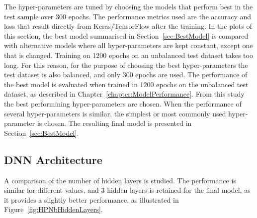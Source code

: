 The hyper-parameters are tuned by choosing the models that perform best in the test sample over 300 epochs. The performance metrics used are the accuracy and loss that result directly from Keras/TensorFlow after the training. In the plots of this section, the best model summarised in Section~\ref{sec:BestModel} is compared with alternative models where all hyper-parameters are kept constant, except one that is changed. Training on 1200 epochs on an unbalanced test dataset takes too long. For this reason, for the purpose of choosing the best hyper-parameters the test dataset is also balanced, and only 300 epochs are used. The performance of the best model is evaluated when trained in 1200 epochs on the unbalanced test dataset, as described in Chapter~\ref{chapter:ModelPerformance}. From this study the best performining hyper-parameters are chosen. When the performance of several hyper-parameters is similar, the simplest or most commonly used hyper-parameter is chosen. The resulting final model is presented in Section~\ref{sec:BestModel}.

\subsection{DNN Architecture}
\label{sec:DNNArchitecture}

A comparison of the number of hidden layers is studied. The performance is similar for different values, and 3 hidden layers is retained for the final model, as it provides a slightly better performance, as illustrated in Figure~\ref{fig:HPNbHiddenLayers}.

